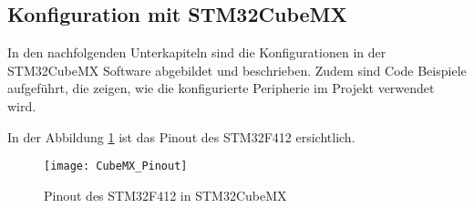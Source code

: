 \subsection{Konfiguration mit STM32CubeMX}
\label{sec:CubeMX}

In den nachfolgenden Unterkapiteln sind die Konfigurationen in der STM32CubeMX Software abgebildet und beschrieben. Zudem sind Code Beispiele aufgeführt, die zeigen, wie die konfigurierte Peripherie im Projekt verwendet wird.

In der Abbildung \ref{pic:CubeMX_Pinout} ist das Pinout des STM32F412 ersichtlich.


\begin{figure}[H]
	\centering
	\texttt{[image: CubeMX\_Pinout]}
	\caption{Pinout des STM32F412 in STM32CubeMX}
	\label{pic:CubeMX_Pinout}
\end{figure}




